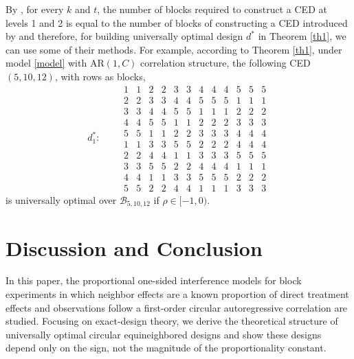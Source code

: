 \documentclass[twoside]{article}
\def \cx#1{\mbox{${\mathcal #1}$}}
\begin{document}
By \cite{FK26}, for every $k$ and $t$, the number of blocks required to construct a CED at levels 1 and 2 is equal to the number of blocks of constructing a CED introduced by \cite{KP22} and therefore, for building universally optimal design $d^*$ in Theorem \ref{th1}, we can use some of their methods. For example, %
according to Theorem \ref{th1}, under model \eqref{model} with AR$(1,C)$ correlation structure, the following CED$(5,10,12)$, with rows as blocks,
\begin{equation*}
d^{*}_1:\qquad \begin{array}{cccccccccccccc}
1 & 1 & 2 & 2 & 3 & 3 & 4 & 4 & 4 & 5 & 5 & 5\\
2 & 2 & 3 & 3 & 4 & 4 & 5 & 5 & 5 & 1 & 1 & 1\\
3 & 3 & 4 & 4 & 5 & 5 & 1 & 1 & 1 & 2 & 2 & 2\\
4 & 4 & 5 & 5 & 1 & 1 & 2 & 2 & 2 & 3 & 3 & 3\\
5 & 5 & 1 & 1 & 2 & 2 & 3 & 3 & 3 & 4 & 4 & 4\\
1 & 1 & 3 & 3 & 5 & 5 & 2 & 2 & 2 & 4 & 4 & 4\\
2 & 2 & 4 & 4 & 1 & 1 & 3 & 3 & 3 & 5 & 5 & 5\\
3 & 3 & 5 & 5 & 2 & 2 & 4 & 4 & 4 & 1 & 1 & 1\\
4 & 4 & 1 & 1 & 3 & 3 & 5 & 5 & 5 & 2 & 2 & 2\\
5 & 5 & 2 & 2  & 4 & 4 & 1 & 1 & 1 & 3 & 3 & 3 
\end{array}
\end{equation*}
is universally optimal over $\cx B_{5,10,12}$ if $\rho\in [-1,0)$. 
\section*{Discussion and Conclusion}   
In this paper, the proportional one-sided interference models for block experiments in which neighbor effects are a known proportion of direct treatment effects and observations follow a first-order circular autoregressive correlation are studied. Focusing on exact-design theory, we derive the theoretical structure of universally optimal circular equineighbored designs and show these designs depend only on the sign, not the magnitude of the proportionality constant. 
\end{document}
